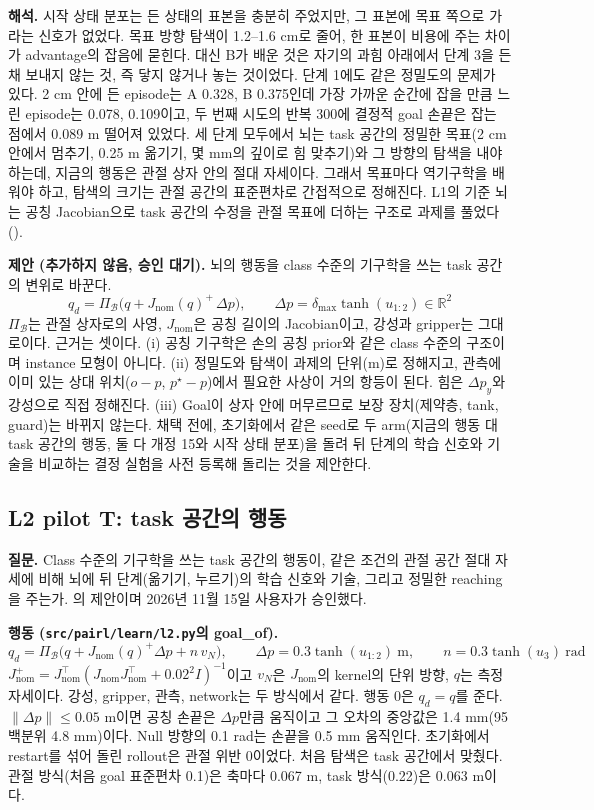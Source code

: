 \documentclass[11pt]{article}\usepackage[margin=1in]{geometry}\usepackage{amsmath,amssymb,amsthm,mathtools}\usepackage{graphicx}\graphicspath{{figures/}{../figures/}{figs/}{./}}\usepackage{enumitem}\usepackage{hyperref}\usepackage{cleveref}\usepackage{tikz}\usetikzlibrary{arrows.meta,positioning,calc,shapes.geometric}\usepackage{float}\usepackage{rotating}\usepackage[most]{tcolorbox}\usepackage{kotex}\usepackage{booktabs}\usepackage{longtable}\emergencystretch=1.6em\tolerance=2000 \crefname{assumption}{Assumption}{Assumptions}\Crefname{assumption}{Assumption}{Assumptions}\crefname{definition}{Definition}{Definitions}\Crefname{definition}{Definition}{Definitions}\crefname{proposition}{Proposition}{Propositions}\Crefname{proposition}{Proposition}{Propositions}\crefname{fact}{Fact}{Facts}\Crefname{fact}{Fact}{Facts} \newtheorem{assumption}{Assumption}\newtheorem{definition}{Definition}\newtheorem{lemma}{Lemma}\newtheorem{proposition}{Proposition}\newtheorem{theorem}{Theorem}\newtheorem{corollary}{Corollary}\newtheorem{fact}{Fact}\theoremstyle{remark}\newtheorem{remark}{Remark} \newcommand{\R}{\mathbb{R}}\newcommand{\xb}{\bar x}\newcommand{\Ab}{\bar A}\newcommand{\By}{\bar B_y}\newcommand{\U}{\mathcal U}\newcommand{\Z}{\mathcal Z}
\begin{document}
\textbf{해석.} 시작 상태 분포는 든 상태의 표본을 충분히 주었지만, 그 표본에 목표 쪽으로 가라는 신호가 없었다. 목표 방향 탐색이 1.2--1.6 cm로 줄어, 한 표본이 비용에 주는 차이가 advantage의 잡음에 묻힌다. 대신 B가 배운 것은 자기의 과힘 아래에서 단계 3을 든 채 보내지 않는 것, 즉 닿지 않거나 놓는 것이었다. 단계 1에도 같은 정밀도의 문제가 있다. 2 cm 안에 든 episode는 A 0.328, B 0.375인데 가장 가까운 순간에 잡을 만큼 느린 episode는 0.078, 0.109이고, 두 번째 시도의 반복 300에 결정적 goal 손끝은 잡는 점에서 0.089 m 떨어져 있었다. 세 단계 모두에서 뇌는 task 공간의 정밀한 목표(2 cm 안에서 멈추기, 0.25 m 옮기기, 몇 mm의 깊이로 힘 맞추기)와 그 방향의 탐색을 내야 하는데, 지금의 행동은 관절 상자 안의 절대 자세이다. 그래서 목표마다 역기구학을 배워야 하고, 탐색의 크기는 관절 공간의 표준편차로 간접적으로 정해진다. L1의 기준 뇌는 공칭 Jacobian으로 task 공간의 수정을 관절 목표에 더하는 구조로 과제를 풀었다().

\textbf{제안 (추가하지 않음, 승인 대기).} 뇌의 행동을 class 수준의 기구학을 쓰는 task 공간의 변위로 바꾼다.
\[
q_d=\Pi_{\mathcal B}\big(q+J_{\mathrm{nom}}(q)^{+}\,\Delta p\big),\qquad \Delta p=\delta_{\max}\tanh(u_{1:2})\in\R^2
\]
$\Pi_{\mathcal B}$는 관절 상자로의 사영, $J_{\mathrm{nom}}$은 공칭 길이의 Jacobian이고, 강성과 gripper는 그대로이다. 근거는 셋이다. (i) 공칭 기구학은 손의 공칭 prior와 같은 class 수준의 구조이며 instance 모형이 아니다. (ii) 정밀도와 탐색이 과제의 단위(m)로 정해지고, 관측에 이미 있는 상대 위치($o-p$, $p^\star-p$)에서 필요한 사상이 거의 항등이 된다. 힘은 $\Delta p_y$와 강성으로 직접 정해진다. (iii) Goal이 상자 안에 머무르므로 보장 장치(제약층, tank, guard)는 바뀌지 않는다. 채택 전에, 초기화에서 같은 seed로 두 arm(지금의 행동 대 task 공간의 행동, 둘 다 개정 15와 시작 상태 분포)을 돌려 뒤 단계의 학습 신호와 기술을 비교하는 결정 실험을 사전 등록해 돌리는 것을 제안한다.

\subsection{L2 pilot T: task 공간의 행동}
\label{sec:l2pt}

\textbf{질문.} Class 수준의 기구학을 쓰는 task 공간의 행동이, 같은 조건의 관절 공간 절대 자세에 비해 뇌에 뒤 단계(옮기기, 누르기)의 학습 신호와 기술, 그리고 정밀한 reaching을 주는가. 의 제안이며 2026년 11월 15일 사용자가 승인했다.

\textbf{행동 (\texttt{src/pairl/learn/l2.py}의 goal\_of).}
\[
q_d=\Pi_{\mathcal B}\big(q+J_{\mathrm{nom}}(q)^{+}\Delta p+n\,v_N\big),\qquad \Delta p=0.3\tanh(u_{1:2})\ \mathrm{m},\qquad n=0.3\tanh(u_3)\ \mathrm{rad}
\]
$J_{\mathrm{nom}}^{+}=J_{\mathrm{nom}}^\top(J_{\mathrm{nom}}J_{\mathrm{nom}}^\top+0.02^2I)^{-1}$이고 $v_N$은 $J_{\mathrm{nom}}$의 kernel의 단위 방향, $q$는 측정 자세이다. 강성, gripper, 관측, network는 두 방식에서 같다. 행동 0은 $q_d=q$를 준다. $\|\Delta p\|\le0.05$ m이면 공칭 손끝은 $\Delta p$만큼 움직이고 그 오차의 중앙값은 1.4 mm(95 백분위 4.8 mm)이다. Null 방향의 0.1 rad는 손끝을 0.5 mm 움직인다. 초기화에서 restart를 섞어 돌린 rollout은 관절 위반 0이었다. 처음 탐색은 task 공간에서 맞췄다. 관절 방식(처음 goal 표준편차 0.1)은 축마다 0.067 m, task 방식(0.22)은 0.063 m이다.
\end{document}

